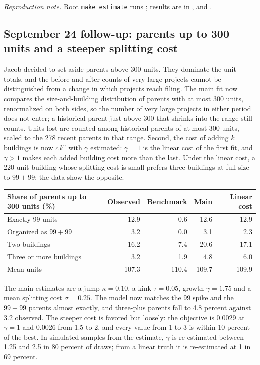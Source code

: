 \textit{Reproduction note.} Root \texttt{make estimate} runs
; results are in ,
 and .

\subsection*{September 24 follow-up: parents up to 300 units and a steeper splitting cost}

Jacob decided to set aside parents above 300 units. They dominate the unit
totals, and the before and after counts of very large projects cannot be
distinguished from a change in which projects reach filing. The main fit now
compares the size-and-building distribution of parents with at most 300 units,
renormalized on both sides, so the number of very large projects in either
period does not enter; a historical parent just above 300 that shrinks into the
range still counts. Units lost are counted among historical parents of at most
300 units, scaled to the 278 recent parents in that range. Second, the cost of
adding $k$ buildings is now $c\,k^\gamma$ with $\gamma$ estimated: $\gamma=1$
is the linear cost of the first fit, and $\gamma>1$ makes each added building
cost more than the last. Under the linear cost, a 220-unit building whose
splitting cost is small prefers three buildings at full size to $99+99$; the data
show the opposite.

\begin{center}
\small
\begin{tabular}{lrrrr}
\hline
Share of parents up to 300 units (\%) & Observed & Benchmark & Main & Linear cost \\
\hline
Exactly 99 units & 12.9 & 0.6 & 12.6 & 12.9 \\
Organized as $99+99$ & 3.2 & 0.0 & 3.1 & 2.3 \\
Two buildings & 16.2 & 7.4 & 20.6 & 17.1 \\
Three or more buildings & 3.2 & 1.9 & 4.8 & 6.0 \\
Mean units & 107.3 & 110.4 & 109.7 & 109.9 \\
\hline
\end{tabular}
\end{center}

The main estimates are a jump $\kappa=0.10$, a kink $\tau=0.05$, growth
$\gamma=1.75$ and a mean splitting cost $\sigma=0.25$. The model now matches the
99 spike and the $99+99$ parents almost exactly, and three-plus parents fall to
4.8 percent against 3.2 observed. The steeper cost is favored but loosely: the
objective is 0.0029 at $\gamma=1$ and 0.0026 from 1.5 to 2, and every value from
1 to 3 is within 10 percent of the best. In simulated samples from the estimate,
$\gamma$ is re-estimated between 1.25 and 2.5 in 80 percent of draws; from a
linear truth it is re-estimated at 1 in 69 percent.

